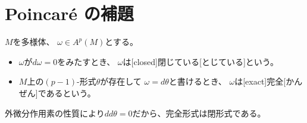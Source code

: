 \documentclass[report]{jlreq}
\begin{document}
\setcounter{chapter}{1}
\section{Poincar\'{e} の補題}

\begin{definition}[閉形式と完全形式]
    $M$を多様体、
    $\omega \in A^p(M)$とする。
    \begin{itemize}
        \item $\omega$が$d\omega = 0$をみたすとき、
            $\omega$は[closed]{閉じている}[とじている]という。
        \item $M$上の$(p - 1)$-形式$\theta$が存在して
            $\omega = d\theta$と書けるとき、
            $\omega$は[exact]{完全}[かんぜん]であるという。
    \end{itemize}
    外微分作用素の性質により$dd\theta = 0$だから、完全形式は閉形式である。
\end{definition}
\end{document}
